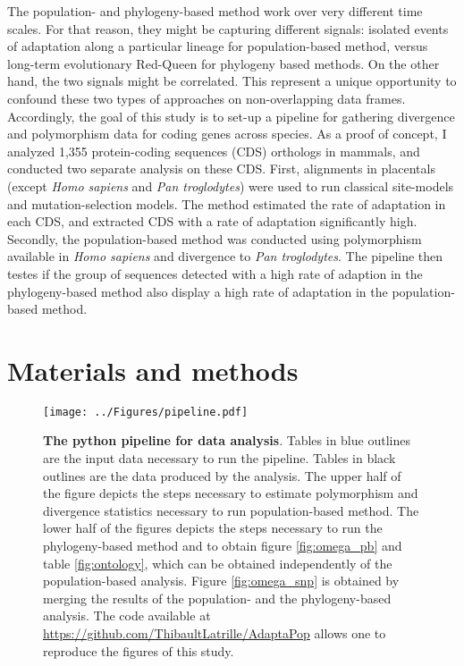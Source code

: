 \documentclass[10pt]{article}
\begin{document}
\begin{multicols}{2}
	The population- and phylogeny-based method work over very different time scales.
	For that reason, they might be capturing different signals: isolated events of adaptation along a particular lineage for population-based method, versus long-term evolutionary Red-Queen for phylogeny based methods. On the other hand, the two signals might be correlated. This represent a unique opportunity to confound these two types of approaches on non-overlapping data frames. Accordingly, the goal of this study is to set-up a pipeline for gathering divergence and polymorphism data for coding genes across species. As a proof of concept, I analyzed 1,355 protein-coding sequences (CDS) orthologs in mammals, and conducted two separate analysis on these CDS. First, alignments in placentals (except \textit{Homo sapiens} and \textit{Pan troglodytes}) were used to run classical site-models and mutation-selection models. The method estimated the rate of adaptation in each CDS, and extracted CDS with a rate of adaptation significantly high. Secondly, the population-based method was conducted using polymorphism available in \textit{Homo sapiens} and divergence to \textit{Pan troglodytes}. The pipeline then testes if the group of sequences detected with a high rate of adaption in the phylogeny-based method also display a high rate of adaptation in the population-based method.

	\section*{Materials and methods}


	\begin{figure*}[hb!]
	\begin{mdframed}
		\centering
		\texttt{[image: ../Figures/pipeline.pdf]}\\
		\caption{ \textbf{The python pipeline for data analysis}. Tables in blue outlines are the input data necessary to run the pipeline. Tables in black outlines are the data produced by the analysis. The upper half of the figure depicts the steps necessary to estimate polymorphism and divergence statistics necessary to run population-based method. The lower half of the figures depicts the steps necessary to run the phylogeny-based method and to obtain figure \ref{fig:omega_pb} and table \ref{fig:ontology}, which can be obtained independently of the population-based analysis. Figure \ref{fig:omega_snp} is obtained by merging the results of the population- and the phylogeny-based analysis. The code available at \href{https://github.com/ThibaultLatrille/AdaptaPop}{https://github.com/ThibaultLatrille/AdaptaPop} allows one to reproduce the figures of this study. \label{fig:pipeline}}
	\end{mdframed}
	\end{figure*}


\end{multicols}
\end{document}
